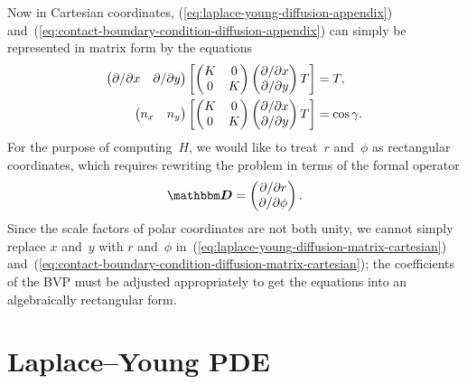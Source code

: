 Now in Cartesian coordinates,
(\ref{eq:laplace-young-diffusion-appendix})
and~(\ref{eq:contact-boundary-condition-diffusion-appendix})
can simply be represented in matrix form
by the equations
\begin{align}
  \begin{pmatrix}
    \pd / {\pd x} & \pd / {\pd y}
  \end{pmatrix}
  \squarebr*{
    \begin{pmatrix}
      K & 0 \\
      0 & K
    \end{pmatrix}
    \begin{pmatrix}
      \pd / {\pd x} \\
      \pd / {\pd y}
    \end{pmatrix}
    T
  }
    &= T,
    \label{eq:laplace-young-diffusion-matrix-cartesian} \\
  \begin{pmatrix}
    n_x & n_y
  \end{pmatrix}
  \squarebr*{
    \begin{pmatrix}
      K & 0 \\
      0 & K
    \end{pmatrix}
    \begin{pmatrix}
      \pd / {\pd x} \\
      \pd / {\pd y}
    \end{pmatrix}
    T
  }
    &= \cos\gamma.
    \label{eq:contact-boundary-condition-diffusion-matrix-cartesian}
\end{align}
For the purpose of computing~$H$,
we would like to treat~$r$ and~$\phi$ as rectangular coordinates,
which requires rewriting the problem in terms of the formal operator
\begin{equation}
  \matder =
    \begin{pmatrix}
      \pd / {\pd r} \\
      \pd / {\pd\phi}
    \end{pmatrix}.
  \label{eq:small-formally-rectangular-derivative-appendix}
\end{equation}
Since the scale factors of polar coordinates are not both unity,
we cannot simply replace $x$ and~$y$ with $r$ and~$\phi$
in~(\ref{eq:laplace-young-diffusion-matrix-cartesian})
and~(\ref{eq:contact-boundary-condition-diffusion-matrix-cartesian});
the coefficients of the BVP must be adjusted appropriately
to get the equations into an algebraically rectangular form.

\section{Laplace--Young PDE}
\label{sec:extraction.pde}

